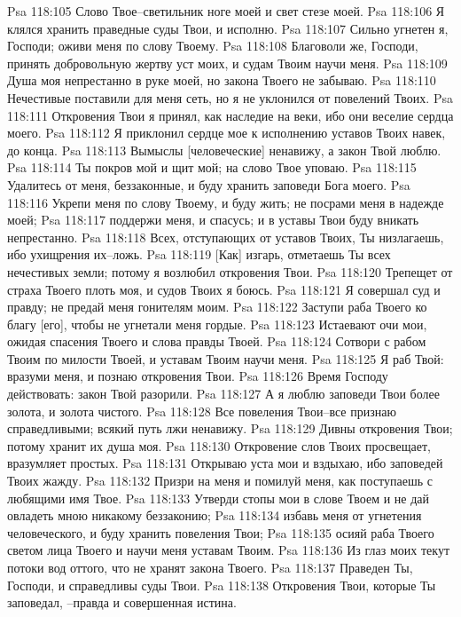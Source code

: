 Psa 118:105  Слово Твое--светильник ноге моей и свет стезе моей.
Psa 118:106  Я клялся хранить праведные суды Твои, и исполню.
Psa 118:107  Сильно угнетен я, Господи; оживи меня по слову Твоему.
Psa 118:108  Благоволи же, Господи, принять добровольную жертву уст моих, и судам Твоим научи меня.
Psa 118:109  Душа моя непрестанно в руке моей, но закона Твоего не забываю.
Psa 118:110  Нечестивые поставили для меня сеть, но я не уклонился от повелений Твоих.
Psa 118:111  Откровения Твои я принял, как наследие на веки, ибо они веселие сердца моего.
Psa 118:112  Я приклонил сердце мое к исполнению уставов Твоих навек, до конца.
Psa 118:113  Вымыслы [человеческие] ненавижу, а закон Твой люблю.
Psa 118:114  Ты покров мой и щит мой; на слово Твое уповаю.
Psa 118:115  Удалитесь от меня, беззаконные, и буду хранить заповеди Бога моего.
Psa 118:116  Укрепи меня по слову Твоему, и буду жить; не посрами меня в надежде моей;
Psa 118:117  поддержи меня, и спасусь; и в уставы Твои буду вникать непрестанно.
Psa 118:118  Всех, отступающих от уставов Твоих, Ты низлагаешь, ибо ухищрения их--ложь.
Psa 118:119  [Как] изгарь, отметаешь Ты всех нечестивых земли; потому я возлюбил откровения Твои.
Psa 118:120  Трепещет от страха Твоего плоть моя, и судов Твоих я боюсь.
Psa 118:121  Я совершал суд и правду; не предай меня гонителям моим.
Psa 118:122  Заступи раба Твоего ко благу [его], чтобы не угнетали меня гордые.
Psa 118:123  Истаевают очи мои, ожидая спасения Твоего и слова правды Твоей.
Psa 118:124  Сотвори с рабом Твоим по милости Твоей, и уставам Твоим научи меня.
Psa 118:125  Я раб Твой: вразуми меня, и познаю откровения Твои.
Psa 118:126  Время Господу действовать: закон Твой разорили.
Psa 118:127  А я люблю заповеди Твои более золота, и золота чистого.
Psa 118:128  Все повеления Твои--все признаю справедливыми; всякий путь лжи ненавижу.
Psa 118:129  Дивны откровения Твои; потому хранит их душа моя.
Psa 118:130  Откровение слов Твоих просвещает, вразумляет простых.
Psa 118:131  Открываю уста мои и вздыхаю, ибо заповедей Твоих жажду.
Psa 118:132  Призри на меня и помилуй меня, как поступаешь с любящими имя Твое.
Psa 118:133  Утверди стопы мои в слове Твоем и не дай овладеть мною никакому беззаконию;
Psa 118:134  избавь меня от угнетения человеческого, и буду хранить повеления Твои;
Psa 118:135  осияй раба Твоего светом лица Твоего и научи меня уставам Твоим.
Psa 118:136  Из глаз моих текут потоки вод оттого, что не хранят закона Твоего.
Psa 118:137  Праведен Ты, Господи, и справедливы суды Твои.
Psa 118:138  Откровения Твои, которые Ты заповедал, --правда и совершенная истина.
